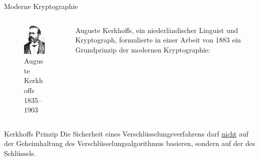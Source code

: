 \documentclass{beamer}
\theoremstyle{plain}
\begin{document}
 \begin{frame}{Moderne Kryptographie}{~}
  \begin{columns}
   \begin{column}{0.3\textwidth}
   \begin{center}
    \begin{figure}
    \includegraphics[height=0.3\textheight]{kerkhoffs}
    \caption{Auguste Kerkhoffs 1835--1903}
    \end{figure}
    \end{center}
   \end{column}
   \begin{column}{0.6\textwidth}
  Auguste Kerkhoffs, ein niederländischer Linguist und Kryptograph, formulierte in einer Arbeit von 1883 ein Grundprinzip der modernen Kryptographie:
 \end{column}
  \end{columns} \pause
  \begin{exampleblock}{Kerkhoffs Prinzip}
   Die Sicherheit eines Verschlüsselungsverfahrens darf \underline{nicht} auf der Geheimhaltung des Verschlüsselungsalgorithmus basieren, sondern auf der des Schlüssels.
  \end{exampleblock}
 \end{frame}
\end{document}
